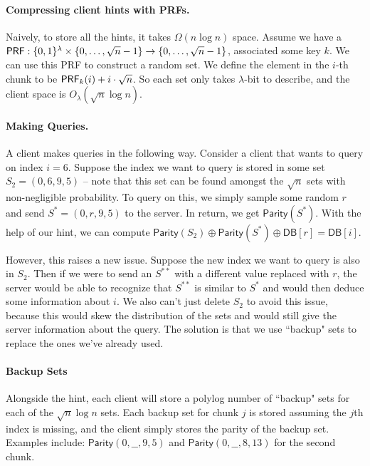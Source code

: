 \paragraph{Compressing client hints with PRFs.}
Naively, to store all the hints, it takes $\Omega(n\log n)$ space.
Assume we have a ${\sf PRF}:\{0,1\}^\lambda\times \{0,\dots,\sqrt{n}-1\}\to \{0,\dots,\sqrt{n}-1\}$, associated some key $k$.
We can use this PRF to construct a random set.
We define the element in the $i$-th chunk to be ${\sf PRF}_k(i)+i\cdot\sqrt{n}$.
So each set only takes $\lambda$-bit to describe, and the client space is $O_\lambda(\sqrt{n}\log n)$.

\paragraph{Making Queries.}
A client makes queries in the following way. Consider a client that wants to query on index $i = 6$. Suppose the index we want to query is stored in some set $S_2 = (0, 6, 9, 5)$ -- note that this set can be found amongst the $\sqrt{n}$ sets with non-negligible probability. To query on this, we simply sample some random $r$ and send $S^* = (0, r, 9, 5)$ to the server. In return, we get $\mathsf{Parity}(S^*)$. With the help of our hint, we can compute $\mathsf{Parity}(S_2) \oplus \mathsf{Parity}(S^*) \oplus \mathsf{DB}[r] = \mathsf{DB}[i]$.

However, this raises a new issue. Suppose the new index we want to query is also in $S_2$. Then if we were to send an $S^{**}$ with a different value replaced with $r$, the server would be able to recognize that $S^{**}$ is similar to $S^*$ and would then deduce some information about $i$. We also can't just delete $S_2$ to avoid this issue, because this would skew the distribution of the sets and would still give the server information about the query. The solution is that we use ``backup" sets to replace the ones we've already used.

\paragraph{Backup Sets}
Alongside the hint, each client will store a polylog number of ``backup" sets for each of the $\sqrt{n}\log n$ sets. Each backup set for chunk $j$ is stored assuming the $j$th index is missing, and the client simply stores the parity of the backup set. Examples include: $\mathsf{Parity}(0, \_\_, 9, 5)$ and $\mathsf{Parity}(0, \_\_, 8, 13)$ for the second chunk. 

